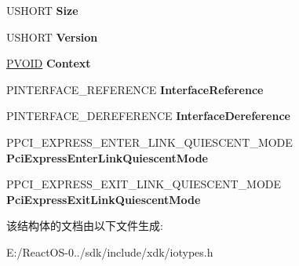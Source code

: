 \begin{DoxyCompactItemize}
\item 
\mbox{\label{struct___p_c_i___e_x_p_r_e_s_s___l_i_n_k___q_u_i_e_s_c_e_n_t___i_n_t_e_r_f_a_c_e_a0ff1c8c27588612c7ffbed7a3a60c5e0}} 
U\+S\+H\+O\+RT {\bfseries Size}
\item 
\mbox{\label{struct___p_c_i___e_x_p_r_e_s_s___l_i_n_k___q_u_i_e_s_c_e_n_t___i_n_t_e_r_f_a_c_e_a45ec28acd0f65221885d6b24ed93bfef}} 
U\+S\+H\+O\+RT {\bfseries Version}
\item 
\mbox{\label{struct___p_c_i___e_x_p_r_e_s_s___l_i_n_k___q_u_i_e_s_c_e_n_t___i_n_t_e_r_f_a_c_e_a69bf9699e848e99ffe7aaa381ed5f5a1}} 
\hyperlink{interfacevoid}{P\+V\+O\+ID} {\bfseries Context}
\item 
\mbox{\label{struct___p_c_i___e_x_p_r_e_s_s___l_i_n_k___q_u_i_e_s_c_e_n_t___i_n_t_e_r_f_a_c_e_af9a43f35ecffbf87822c441d7281df12}} 
P\+I\+N\+T\+E\+R\+F\+A\+C\+E\+\_\+\+R\+E\+F\+E\+R\+E\+N\+CE {\bfseries Interface\+Reference}
\item 
\mbox{\label{struct___p_c_i___e_x_p_r_e_s_s___l_i_n_k___q_u_i_e_s_c_e_n_t___i_n_t_e_r_f_a_c_e_adf11b1b81cdcb87b665e61a513fe83f6}} 
P\+I\+N\+T\+E\+R\+F\+A\+C\+E\+\_\+\+D\+E\+R\+E\+F\+E\+R\+E\+N\+CE {\bfseries Interface\+Dereference}
\item 
\mbox{\label{struct___p_c_i___e_x_p_r_e_s_s___l_i_n_k___q_u_i_e_s_c_e_n_t___i_n_t_e_r_f_a_c_e_a3e8c48371b1239e54938da0b0687b2f9}} 
P\+P\+C\+I\+\_\+\+E\+X\+P\+R\+E\+S\+S\+\_\+\+E\+N\+T\+E\+R\+\_\+\+L\+I\+N\+K\+\_\+\+Q\+U\+I\+E\+S\+C\+E\+N\+T\+\_\+\+M\+O\+DE {\bfseries Pci\+Express\+Enter\+Link\+Quiescent\+Mode}
\item 
\mbox{\label{struct___p_c_i___e_x_p_r_e_s_s___l_i_n_k___q_u_i_e_s_c_e_n_t___i_n_t_e_r_f_a_c_e_a2db588c3cded57f1320e7b981c8bd0bf}} 
P\+P\+C\+I\+\_\+\+E\+X\+P\+R\+E\+S\+S\+\_\+\+E\+X\+I\+T\+\_\+\+L\+I\+N\+K\+\_\+\+Q\+U\+I\+E\+S\+C\+E\+N\+T\+\_\+\+M\+O\+DE {\bfseries Pci\+Express\+Exit\+Link\+Quiescent\+Mode}
\end{DoxyCompactItemize}


该结构体的文档由以下文件生成\+:\begin{DoxyCompactItemize}
\item 
E\+:/\+React\+O\+S-\/0../sdk/include/xdk/iotypes.\+h\end{DoxyCompactItemize}
